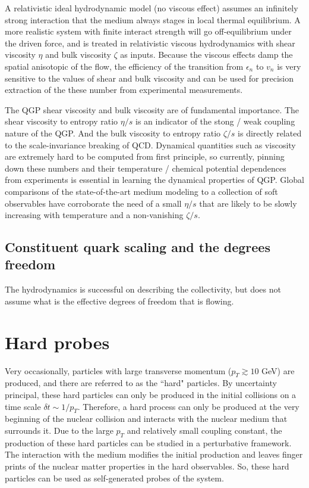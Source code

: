 A relativistic ideal hydrodynamic model (no viscous effect) assumes an infinitely strong interaction that the medium always stages in local thermal equilibrium.
A more realistic system with finite interact strength will go off-equilibrium under the driven force, and is treated in relativistic viscous hydrodynamics with shear viscosity $\eta$ and bulk viscosity $\zeta$ as inputs.
Because the viscous effects damp the spatial anisotopic of the flow, the efficiency of the transition from $\epsilon_n$ to $v_n$ is very sensitive to the values of shear and bulk viscosity and can be used for precision extraction of the these number from experimental measurements.

The QGP shear viscosity and bulk viscosity are of fundamental importance. 
The shear viscosity to entropy ratio $\eta/s$ is an indicator of the stong / weak coupling nature of the QGP. 
And the bulk viscosity to entropy ratio $\zeta/s$ is directly related to  the scale-invariance breaking of QCD.
Dynamical quantities such as viscosity are extremely hard to be computed from first principle, so currently, pinning down these numbers and their temperature / chemical potential dependences from experiments is essential in learning the dynamical properties of QGP.
Global comparisons of the state-of-the-art medium modeling to a collection of soft observables have corroborate the need of a small $\eta/s$ that are likely to be slowly increasing with temperature and a non-vanishing $\zeta/s$.

\subsection{Constituent quark scaling and the degrees freedom}
The hydrodynamics is successful on describing the collectivity, but does not assume what is the effective degrees of freedom that is flowing.

\section{Hard probes}
Very occasionally, particles with large transverse momentum ($p_T\gtrsim 10$ GeV) are produced, and there are referred to as the ``hard" particles.
By uncertainty principal, these hard particles can only be produced in the initial collisions on a time scale $\delta t \sim 1/p_T$.
Therefore, a hard process can only be produced at the very beginning of the nuclear collision and interacts with the nuclear medium that surrounds it.
Due to the large $p_T$ and relatively small coupling constant, the production of these hard particles can be studied in a perturbative framework.
The interaction with the medium modifies the initial production and leaves finger prints of the nuclear matter properties in the hard observables. 
So, these hard particles can be used as self-generated probes of the system.
